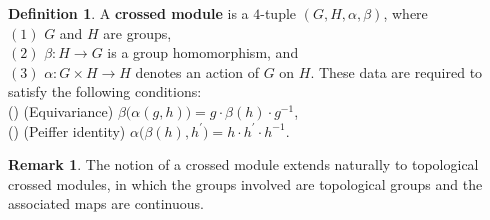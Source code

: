 \documentclass{article}
\theoremstyle{plain}
\theoremstyle{definition}
\newtheorem{defn}[thm]{Definition}
\newtheorem{rem}[thm]{Remark}
\newcommand{\rNum}[1]{\lowercase\expandafter{\romannumeral #1\relax}}
\begin{document}
\begin{defn}\cite{MR30760}\cite[on page 8]{MR2597732}
A \textbf{crossed module} is a $4$-tuple $(G,H,\alpha,\beta)$, where \\
$(1)$ $G$ and $H$ are groups, \\
$(2)$ $\beta:H \longrightarrow G$ is a group homomorphism, and \\
$(3)$ $\alpha:G \times H \longrightarrow H$ denotes an action of $G$ on $H$.
These data are required to satisfy the following conditions: \\
(\rNum{1}) (Equivariance) $\beta\bigl(\alpha(g,h)\bigr) = g \cdot \beta(h) \cdot g^{-1}$, \\
(\rNum{2}) (Peiffer identity) $\alpha\bigl(\beta(h),h^\prime\bigr) = h \cdot h^\prime \cdot h^{-1}$.
\end{defn}
\begin{rem}
The notion of a crossed module extends naturally to topological crossed modules, in which the groups involved are topological groups and the associated maps are continuous.
\end{rem}
\end{document}
